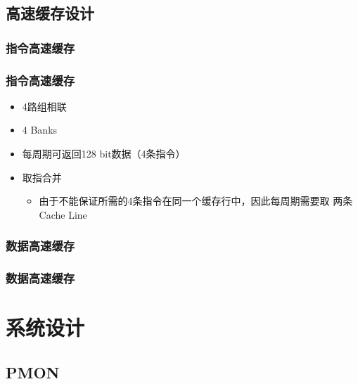 \documentclass{beamer}
\begin{document}
\subsection{高速缓存设计}

\subsubsection{指令高速缓存}

\begin{frame}
    \frametitle{指令高速缓存}

    \begin{itemize}
        \item 4路组相联
        \item 4 Banks
        \item 每周期可返回128 bit数据（4条指令）
        \item 取指合并\begin{itemize}
            \item 由于不能保证所需的4条指令在同一个缓存行中，因此每周期需要取
                  两条Cache Line
        \end{itemize}
    \end{itemize}

\end{frame}

\subsubsection{数据高速缓存}

\begin{frame}
    \frametitle{数据高速缓存}
\end{frame}

\section{系统设计}

\subsection{PMON}
\end{document}
